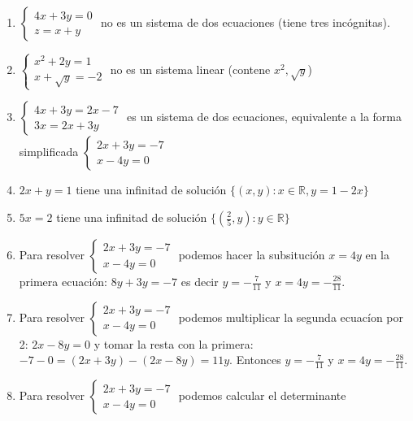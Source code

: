 \begin{enumerate}
\item 
$\left\{\begin{aligned}
  4x + 3y = 0 \\
  z = x + y
\end{aligned}\right.$ no es un sistema de dos ecuaciones (tiene tres
incógnitas).

\item 
$\left\{\begin{aligned}
  x^2 + 2y = 1 \\
  x + \sqrt{y} = -2
\end{aligned}\right.$ no es un sistema linear (contene $x^2, \sqrt{y}$)

\item
$\left\{
\begin{aligned}
  4x + 3y = 2x - 7 \\
  3x = 2x + 3y
\end{aligned}\right.$ es un sistema de dos ecuaciones, equivalente a la forma
simplificada
$\left\{
\begin{aligned}
  2x+3y = -7 \\
  x -4y = 0
\end{aligned}\right.$
\item $2x + y = 1$ tiene una infinitad de solución
  $\{ {(x, y)} : x \in \mathbb R, y = 1 - 2x \}$
\item $5x = 2$ tiene una infinitad de solución
  $\{ {(\frac{2}{5}, y)} : y \in {\mathbb R} \}$
\item  Para resolver $\left\{
\begin{aligned}
  2x+3y = -7 \\
  x -4y = 0
\end{aligned}\right.$ podemos hacer la subsitución $x = 4y$ en la primera
ecuación: $8y + 3y = -7$ es decir
$y = -\frac{7}{11}$ y $x = 4y = -\frac{28}{11}$.
\item  Para resolver $\left\{
\begin{aligned}
  2x+3y = -7 \\
  x -4y = 0
\end{aligned}\right.$ podemos multiplicar la segunda ecuacíon por 2:
$2x - 8y = 0$ y tomar la resta con la primera:
$-7 - 0 = {(2x + 3y)} - {(2x-8y)} = 11y$. Entonces $y = -\frac{7}{11}$ y
$x = 4y = -\frac{28}{11}$.
\item  Para resolver $\left\{
\begin{aligned}
  2x+3y = -7 \\
  x -4y = 0
\end{aligned}\right.$ podemos calcular el determinante

\end{enumerate}
